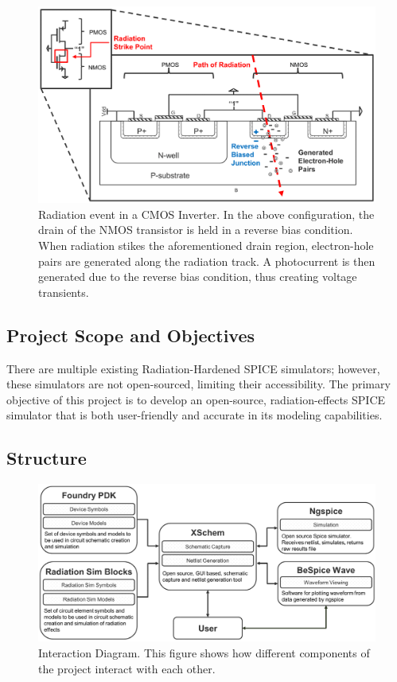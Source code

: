 \documentclass[conference]{IEEEtran}
\begin{document}
    \begin{figure}[htbp]
        \centering
        \includegraphics[width=1\linewidth]{Inverter_Image_B_W_cropped}
        \caption{Radiation event in a CMOS Inverter. In the above configuration, the drain of the NMOS transistor is held in a reverse bias condition. When radiation stikes the aforementioned drain region, electron-hole pairs are generated along the radiation track. A photocurrent is then generated due to the reverse bias condition, thus creating voltage transients.}
        \label{fig:cmos_inverter}
    \end{figure}
    
        \subsection{Project Scope and Objectives}\label{subsec:project-scope-and-objectives}
    There are multiple existing Radiation-Hardened SPICE simulators; however, these simulators are not open-sourced, limiting their accessibility.
    The primary objective of this project is to develop an open-source, radiation-effects SPICE simulator that is both user-friendly and accurate in its modeling capabilities.
    
    \subsection{Structure}\label{subsec:project-structure}
    
        \begin{figure}[htbp]
        \centering
        \includegraphics[width=0.95\linewidth]{Block_Diagram_B_W_cropped}
        \caption{Interaction Diagram. This figure shows how different components of the project interact with each other.}
        \label{fig:interaction_diagram}
    \end{figure}
    
\end{document}

